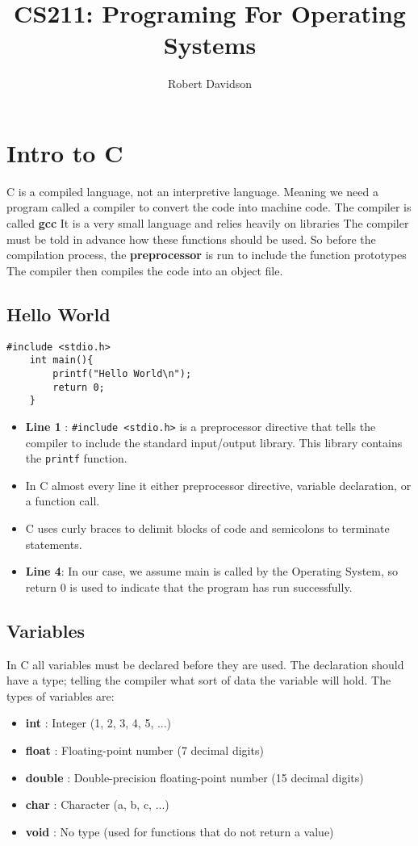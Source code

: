 \documentclass[a4paper, 10pt]{article}
\title{
\textbf{CS211: Programing For Operating Systems} \\ 
}
\author{
Robert Davidson
}
\date{}
\begin{document}
\maketitle
\pagebreak

\tableofcontents
\pagebreak
\section{Intro to C}
C is a compiled language, not an interpretive language. Meaning we need a program called a compiler to convert the code into machine code. The compiler is called \textbf{gcc}
It is a very small language and relies heavily on libraries
The compiler must be told in advance how these functions should be used. So before the compilation process, the \textbf{preprocessor} is run to include the function prototypes The compiler then compiles the code into an object file.

\subsection{Hello World}
\begin{lstlisting}[style=cStyle, caption={Hello World in C}]
    #include <stdio.h>
    int main(){
        printf("Hello World\n");
        return 0;
    }
    \end{lstlisting}
\begin{itemize}
    \item \textbf{Line 1} : \texttt{\#include <stdio.h>} is a preprocessor directive that tells the compiler to include the standard input/output library. This library contains the \texttt{printf} function.
    \item In C almost every line it either preprocessor directive, variable declaration, or a function call.
    \item C uses curly braces to delimit blocks of code and semicolons to terminate statements.
    \item \textbf{Line 4}: In our case, we assume main is called by the Operating System, so return 0 is used to indicate that the program has run successfully.
\end{itemize}

\subsection{Variables}
In C all variables must be declared before they are used. The declaration should have a type; telling the compiler what sort of data the variable will hold. The types of variables are:
\begin{itemize}
    \item \textbf{int} : Integer (1, 2, 3, 4, 5, ...)
    \item \textbf{float} : Floating-point number (7 decimal digits)
    \item \textbf{double} : Double-precision floating-point number (15 decimal digits)
    \item \textbf{char} : Character (a, b, c, ...)
    \item \textbf{void} : No type  (used for functions that do not return a value)
\end{itemize}
\end{document}
